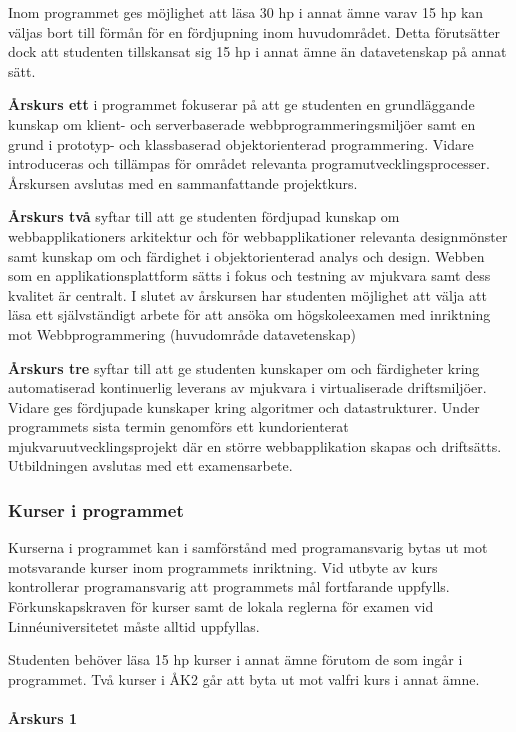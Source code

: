 \documentclass[swedish]{LnuCmThesis}
\begin{document}
Inom programmet ges möjlighet att läsa 30 hp i annat ämne varav 15 hp kan väljas bort till förmån för en fördjupning inom huvudområdet. Detta förutsätter dock att studenten tillskansat sig 15 hp i annat ämne än datavetenskap på annat sätt.

\textbf{Årskurs ett} i programmet fokuserar på att ge studenten en grundläggande kunskap om klient- och serverbaserade webbprogrammeringsmiljöer samt en grund i prototyp- och klassbaserad objektorienterad programmering. Vidare introduceras och tillämpas för området relevanta programutvecklingsprocesser. Årskursen avslutas med en sammanfattande projektkurs.

\textbf{Årskurs två} syftar till att ge studenten fördjupad kunskap om webbapplikationers arkitektur och för webbapplikationer relevanta designmönster samt kunskap om och färdighet i objektorienterad analys och design. Webben som en applikationsplattform sätts i fokus och testning av mjukvara samt dess kvalitet är centralt. 
I slutet av årskursen har studenten möjlighet att välja att läsa ett självständigt arbete för att ansöka om högskoleexamen med inriktning mot Webbprogrammering (huvudområde datavetenskap)

\textbf{Årskurs tre} syftar till att ge studenten kunskaper om och färdigheter kring automatiserad kontinuerlig leverans av mjukvara i virtualiserade driftsmiljöer. Vidare ges fördjupade kunskaper kring algoritmer och datastrukturer.
Under programmets sista termin genomförs ett kundorienterat mjukvaruutvecklingsprojekt där en större webbapplikation skapas och driftsätts. 
Utbildningen avslutas med ett examensarbete.

\subsubsection*{Kurser i programmet}

Kurserna i programmet kan i samförstånd med programansvarig bytas ut mot
motsvarande kurser inom programmets inriktning. Vid utbyte av kurs kontrollerar
programansvarig att programmets mål fortfarande uppfylls. Förkunskapskraven för
kurser samt de lokala reglerna för examen vid Linnéuniversitetet måste alltid uppfyllas.

Studenten behöver läsa 15 hp kurser i annat ämne förutom de som ingår i programmet. Två kurser i ÅK2 går att byta ut mot valfri kurs i annat ämne.

\paragraph*{Årskurs 1}
\end{document}
